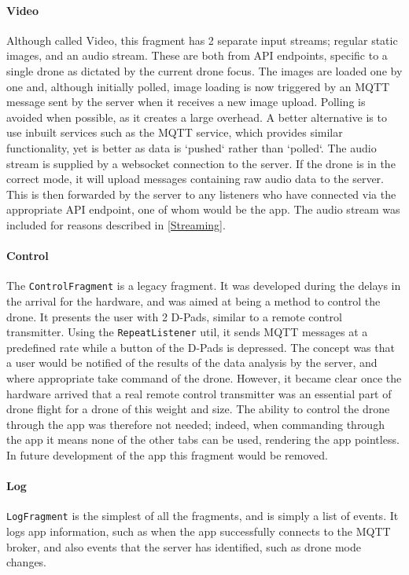 \documentclass{article}
\begin{document}
\paragraph{Video}
Although called Video, this fragment has 2 separate input streams; regular static images, and an audio stream. These are both from API endpoints, specific to a single drone as dictated by the current drone focus. The images are loaded one by one and, although initially polled, image loading is now triggered by an MQTT message sent by the server when it receives a new image upload. Polling is avoided when possible, as it creates a large overhead. A better alternative is to use inbuilt services such as the MQTT service, which provides similar functionality, yet is better as data is `pushed` rather than `polled`. The audio stream is supplied by a websocket connection to the server. If the drone is in the correct mode, it will upload messages containing raw audio data to the server. This is then forwarded by the server to any listeners who have connected via the appropriate API endpoint, one of whom would be the app. The audio stream was included for reasons described in \ref{Streaming}.

\paragraph{Control}
The \texttt{ControlFragment} is a legacy fragment. It was developed during the delays in the arrival for the hardware, and was aimed at being a method to control the drone. It presents the user with 2 D-Pads, similar to a remote control transmitter. Using the \texttt{RepeatListener} util, it sends MQTT messages at a predefined rate while a button of the D-Pads is depressed. The concept was that a user would be notified of the results of the data analysis by the server, and where appropriate take command of the drone. However, it became clear once the hardware arrived that a real remote control transmitter was an essential part of drone flight for a drone of this weight and size. The ability to control the drone through the app was therefore not needed; indeed, when commanding through the app it means none of the other tabs can be used, rendering the app pointless. In future development of the app this fragment would be removed.

\paragraph{Log}
\texttt{LogFragment} is the simplest of all the fragments, and is simply a list of events. It logs app information, such as when the app successfully connects to the MQTT broker, and also events that the server has identified, such as drone mode changes. 
\end{document}
